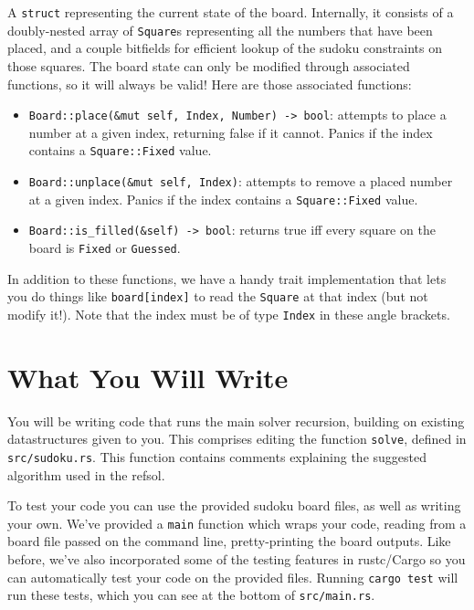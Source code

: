 \documentclass{article}
\begin{document}
A \texttt{struct} representing the current state of the board. Internally, it consists of a doubly-nested array of \texttt{Square}s representing all the numbers that have been placed, and a couple bitfields for efficient lookup of the sudoku constraints on those squares. The board state can only be modified through associated functions, so it will always be valid! Here are those associated functions:
\begin{itemize}
    \item \texttt{Board::place(\&mut self, Index, Number) -> bool}: attempts to place a number at a given index, returning false if it cannot. Panics if the index contains a \texttt{Square::Fixed} value.
    \item \texttt{Board::unplace(\&mut self, Index)}: attempts to remove a placed number at a given index. Panics if the index contains a \texttt{Square::Fixed} value.
    \item \texttt{Board::is\_filled(\&self) -> bool}: returns true iff every square on the board is \texttt{Fixed} or \texttt{Guessed}.
\end{itemize}

In addition to these functions, we have a handy trait implementation that lets you do things like \texttt{board[index]} to read the \texttt{Square} at that index (but not modify it!). Note that the index must be of type \texttt{Index} in these angle brackets.

\section*{What You Will Write}

You will be writing code that runs the main solver recursion, building on existing datastructures given to you. This comprises editing the function \texttt{solve}, defined in \texttt{src/sudoku.rs}. This function contains comments explaining the suggested algorithm used in the refsol.

To test your code you can use the provided sudoku board files, as well as writing your own. We've provided a \texttt{main} function which wraps your code, reading from a board file passed on the command line, pretty-printing the board outputs. Like before, we've also incorporated some of the testing features in rustc/Cargo so you can automatically test your code on the provided files. Running \texttt{cargo test} will run these tests, which you can see at the bottom of \texttt{src/main.rs}.
\end{document}
